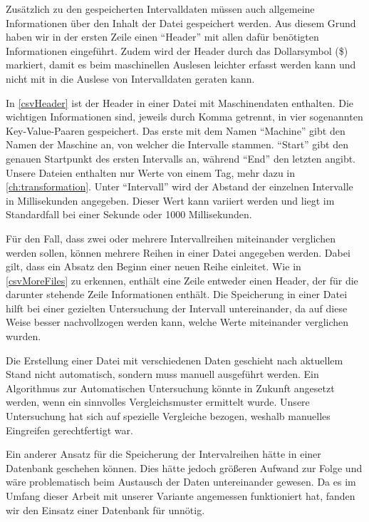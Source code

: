 \newpage
{}
Zusätzlich zu den gespeicherten Intervalldaten müssen auch allgemeine Informationen über den Inhalt der Datei gespeichert werden. Aus diesem Grund haben wir in der ersten Zeile einen \enquote{Header} mit allen dafür benötigten Informationen eingeführt. Zudem wird der Header durch das Dollarsymbol (\$) markiert, damit es beim maschinellen Auslesen leichter erfasst werden kann und nicht mit in die Auslese von Intervalldaten geraten kann.


In \autoref{csvHeader} ist der Header in einer Datei mit Maschinendaten enthalten. Die wichtigen Informationen sind, jeweils durch Komma getrennt, in vier sogenannten Key-Value-Paaren gespeichert. Das erste mit dem Namen \enquote{Machine} gibt den Namen der Maschine an, von welcher die Intervalle stammen. \enquote{Start} gibt den genauen Startpunkt des ersten Intervalls an, während \enquote{End} den letzten angibt. Unsere Dateien enthalten nur Werte von einem Tag, mehr dazu in \autoref{ch:transformation}. Unter \enquote{Intervall} wird der Abstand der einzelnen Intervalle in Millisekunden angegeben. Dieser Wert kann variiert werden und liegt im Standardfall bei einer Sekunde oder 1000 Millisekunden.

\vspace{60pt}


\newpage
{}
Für den Fall, dass zwei oder mehrere Intervallreihen miteinander verglichen werden sollen, können mehrere Reihen in einer Datei angegeben werden. Dabei gilt, dass ein Absatz den Beginn einer neuen Reihe einleitet. Wie in \autoref{csvMoreFiles} zu erkennen, enthält eine Zeile entweder einen Header, der für die darunter stehende Zeile Informationen enthält. Die Speicherung in einer Datei hilft bei einer gezielten Untersuchung der Intervall untereinander, da auf diese Weise besser nachvollzogen werden kann, welche Werte miteinander verglichen wurden.

\vspace{30pt}



\vspace{20pt}
Die Erstellung einer Datei mit verschiedenen Daten geschieht nach aktuellem Stand nicht automatisch, sondern muss manuell ausgeführt werden. Ein Algorithmus zur Automatischen Untersuchung könnte in Zukunft angesetzt werden, wenn ein sinnvolles Vergleichsmuster ermittelt wurde. Unsere Untersuchung hat sich auf spezielle Vergleiche bezogen, weshalb manuelles Eingreifen gerechtfertigt war. 


Ein anderer Ansatz für die Speicherung der Intervalreihen hätte in einer Datenbank geschehen können. Dies hätte jedoch größeren Aufwand zur Folge und wäre problematisch beim Austausch der Daten untereinander gewesen. Da es im Umfang dieser Arbeit mit unserer Variante angemessen funktioniert hat, fanden wir den Einsatz einer Datenbank für unnötig.
